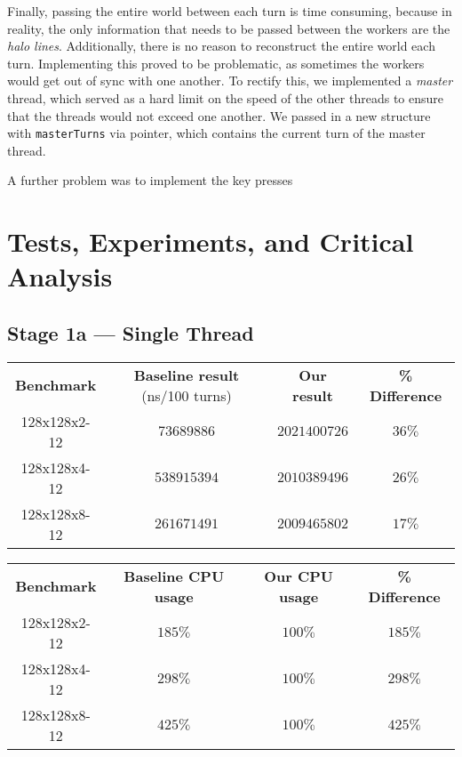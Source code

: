 \documentclass[11pt,a4paper,dvipsnames,cmyk]{scrartcl}
\begin{document}
\begin{multicols}{2}
Finally, passing the entire world between each turn is time consuming,
because in reality, the only information that needs to be passed between
the workers are the \textit{halo lines}. Additionally, there is no reason
to reconstruct the entire world each turn. Implementing this proved to be
problematic, as sometimes the workers would get out of sync with one
another. To rectify this, we implemented a \textit{master} thread, which
served as a hard limit on the speed of the other threads to ensure that
the threads would not exceed one another. We passed in a new structure
with \texttt{masterTurns} via pointer, which contains the current turn of
the master thread.

A further problem was to implement the key presses %



\end{multicols}
\newpage

\section*{Tests, Experiments, and Critical Analysis}%
\label{sec:experiment-and-analysis}

\subsection*{Stage 1a --- Single Thread}%
\label{sub:single-thread}
\begin{center}
    \begin{tabular}{|c|c|c|c|}
        \hline
        \textbf{Benchmark} & \textbf{Baseline result} (ns/100 turns) &
        \textbf{Our result} & \textbf{\% Difference} \\ \hhline{|=|=|=|=|}
        128x128x2-12 & $73689886$ & $2021400726$ & $36\%$ \\ \hline
        128x128x4-12 & $538915394$ & $2010389496$ & $26\%$ \\ \hline
        128x128x8-12 & $261671491$ & $2009465802$ & $17\%$ \\ \hline
    \end{tabular}
\end{center}

\begin{center}
    \begin{tabular}{|c|c|c|c|}
        \hline
        \textbf{Benchmark} & \textbf{Baseline CPU usage} &
        \textbf{Our CPU usage} & \textbf{\% Difference} \\ \hhline{|=|=|=|=|}
        128x128x2-12 & $185\%$ & $100\%$ & $185\%$ \\ \hline
        128x128x4-12 & $298\%$ & $100\%$ & $298\%$ \\ \hline
        128x128x8-12 & $425\%$ & $100\%$ & $425\%$ \\ \hline
    \end{tabular}
\end{center}
\end{document}
